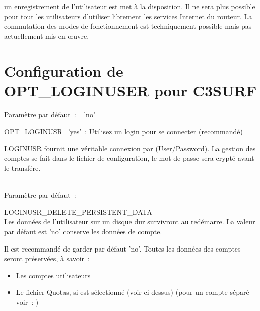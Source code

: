 un enregistrement de l'utilisateur est met à la disposition. Il ne sera plus
possible pour tout les utilisateurs d'utiliser librement les services Internet
du routeur. La commutation des modes de fonctionnement est techniquement possible
mais pas actuellement mis en œuvre.


\section{Configuration de OPT\_LOGINUSER pour C3SURF}

\begin{description}

  Paramètre par défaut~: ='no'

  OPT\_LOGINUSR='yes'~: Utilisez un login pour se connecter (recommandé)

  LOGINUSR fournit une véritable connexion par (User/Password). La gestion
  des comptes se fait dans le fichier de configuration, le mot de passe
  sera crypté avant le transfére.

\ \\
  Paramètre par défaut~: 

  LOGINUSR\_DELETE\_PERSISTENT\_DATA\\
  Les données de l'utilisateur sur un disque dur survivront au redémarre.
  La valeur par défaut est 'no' conserve les données de compte.


  Il est recommandé de garder par défaut 'no'. Toutes les données des comptes
  seront préservées, à savoir~:

\begin{itemize}
\item Les comptes utilisateurs
\item Le fichier Quotas, si  est sélectionné 
(voir ci-dessus) (pour un compte séparé voir~: )
\end{itemize}


\end{description}
